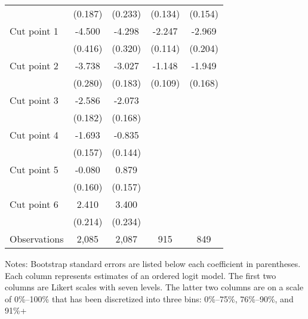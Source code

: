 \begin{table}[ht]
{\begin{threeparttable}
\begin{tabular}{lcccc}
 & (0.187) & (0.233) & (0.134) & (0.154) \\ 
Cut point 1 & -4.500 & -4.298 & -2.247 & -2.969 \\ 
 & (0.416) & (0.320) & (0.114) & (0.204) \\ 
Cut point 2 & -3.738 & -3.027 & -1.148 & -1.949 \\ 
 & (0.280) & (0.183) & (0.109) & (0.168) \\ 
Cut point 3 & -2.586 & -2.073 &  &  \\ 
 & (0.182) & (0.168) &  &  \\ 
Cut point 4 & -1.693 & -0.835 &  &  \\ 
 & (0.157) & (0.144) &  &  \\ 
Cut point 5 & -0.080 & 0.879 &  &  \\ 
 & (0.160) & (0.157) &  &  \\ 
Cut point 6 & 2.410 & 3.400 &  &  \\ 
 & (0.214) & (0.234) &  &  \\ 
\midrule
Observations & 2,085 & 2,087 & 915 & 849 \\ 
\bottomrule
\end{tabular}
\footnotesize Notes: Bootstrap standard errors are listed below each coefficient in parentheses. Each column represents estimates of an ordered logit model. The first two columns are Likert scales with seven levels. The latter two columns are on a scale of 0\%--100\% that has been discretized into three bins: 0\%--75\%, 76\%--90\%, and 91\%+ 
\end{threeparttable}
}
\end{table}
